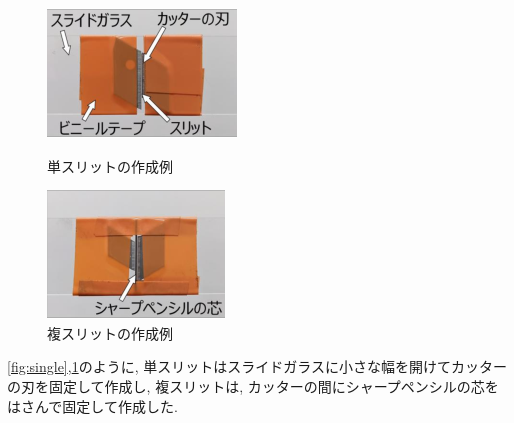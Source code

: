 \documentclass[11pt]{ltjsarticle}
\begin{document}
      \begin{figure}[H]
        \centering
        \begin{minipage}[b]{0.32\columnwidth}
          \centering
          \includegraphics[width=\linewidth]{LD_single.png}
          \caption{単スリットの作成例}
          \label{fig:single}
        \end{minipage}
        \begin{minipage}[b]{0.32\columnwidth}
          \centering
          \includegraphics[width=\linewidth]{LD_double.png}
          \caption{複スリットの作成例}
          \label{fig:double}
        \end{minipage}
      \end{figure}
      \noindent \cref{fig:single},\cref{fig:double}のように, 単スリットはスライドガラスに小さな幅を開けてカッターの刃を固定して作成し, 複スリットは, カッターの間にシャープペンシルの芯をはさんで固定して作成した.
\end{document}
